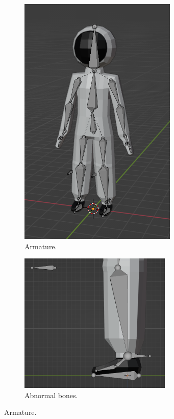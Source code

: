 \begin{figure}[!htb]
    \centering
    \begin{subfigure}{0.45\textwidth}
        \centering
        \includegraphics[height=0.8\textwidth]{chapters/theoretical_foundations/sections/models/resources/Armature.png}
        \caption{Armature.}
        \label{fig:armature}
    \end{subfigure}
    \hfill
    \begin{subfigure}{0.45\textwidth}
        \centering
        \includegraphics[width=0.8\textwidth]{chapters/theoretical_foundations/sections/models/resources/ArmatureFoot.png}
        \caption{Abnormal bones.}
        \label{fig:armature_foot}
    \end{subfigure}

    \caption{Armature.}
\end{figure}

